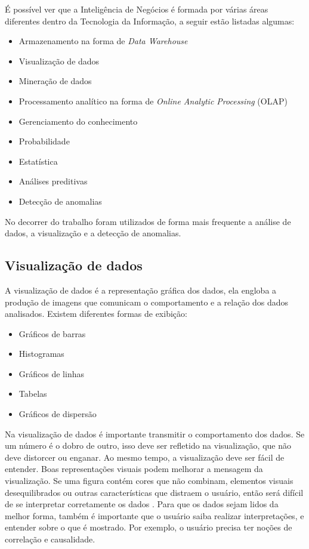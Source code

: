 É possível ver que a Inteligência de Negócios é formada por várias áreas diferentes dentro da Tecnologia da Informação, a seguir estão listadas algumas:

\begin{itemize}
	\item Armazenamento na forma de \textit{Data Warehouse}
	\item Visualização de dados
	\item Mineração de dados
	\item Processamento analítico na forma de \textit{Online Analytic Processing} (OLAP)
	\item Gerenciamento do conhecimento
	\item Probabilidade
	\item Estatística
	\item Análises preditivas
	\item Detecção de anomalias
\end{itemize}

No decorrer do trabalho foram utilizados de forma mais frequente a análise de dados, a visualização e a detecção de anomalias.

\subsection{Visualização de dados}

A visualização de dados é a representação gráfica dos dados, ela engloba a produção de imagens que comunicam o comportamento e a relação dos dados analisados. Existem diferentes formas de exibição:

\begin{itemize}
	\item Gráficos de barras
	\item Histogramas
	\item Gráficos de linhas
	\item Tabelas
	\item Gráficos de dispersão
\end{itemize}

Na visualização de dados é importante transmitir o comportamento dos dados. Se um número é o dobro de outro, isso deve ser refletido na visualização, que não deve distorcer ou enganar. Ao mesmo tempo, a visualização deve ser fácil de entender. Boas representações visuais podem melhorar a mensagem da visualização. Se uma figura contém cores que não combinam, elementos visuais desequilibrados ou outras características que distraem o usuário, então será difícil de se interpretar corretamente os dados \cite{claus1}. Para que os dados sejam lidos da melhor forma, também é importante que o usuário saiba realizar interpretações, e entender sobre o que é mostrado. Por exemplo, o usuário precisa ter noções de correlação e causalidade.


